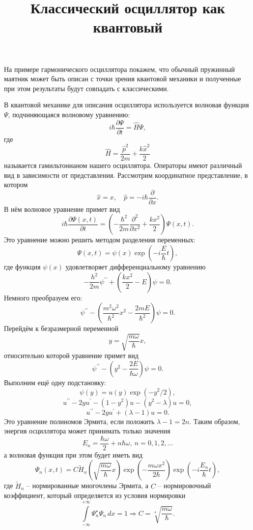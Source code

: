 

\title{Классический осциллятор как квантовый}


\maketitle

На примере гармонического осциллятора покажем, что обычный пружинный маятник может быть описан с точки зрения квантовой механики и полученные при этом результаты будут совпадать с классическими.

В квантовой механике для описания осциллятора используется волновая функция \(\Psi\), подчиняющаяся волновому уравнению:
\[
    i\hbar\frac{\partial \Psi}{\partial t} = \hat{H}\Psi,
\]
где
\[
    \hat{H} = \frac{\hat{p}^2}{2m} + \frac{k\hat{x}^2}{2}
\]
называется гамильтонианом нашего осциллятора. Операторы имеют различный вид в зависимости от представления. Рассмотрим координатное представление, в котором
\[
    \hat{x} = x,\quad \hat{p} = -i\hbar\frac{\partial}{\partial x}.
\]
В нём волновое уравнение примет вид
\[
    i\hbar\frac{\partial \Psi(x,t)}{\partial t} = \left( -\frac{\hbar^2}{2m}\frac{\partial^2}{\partial x^2} + \frac{kx^2}{2} \right)\Psi(x,t).
\]
Это уравнение можно решить методом разделения переменных:
\[
    \Psi(x,t) = \psi(x)\exp\left(-i\frac{E}{\hbar}t\right),
\]
где функция \(\psi(x)\) удовлетворяет дифференциальному уравнению
\[
    -\frac{h^2}{2m}\psi^{\prime\prime} + \left(\frac{kx^2}{2} - E\right)\psi = 0.
\]
Немного преобразуем его:
\[
    \psi^{\prime\prime} - \left(\frac{m^2\omega^2}{\hbar^2}x^2 - \frac{2mE}{\hbar^2}\right)\psi = 0.
\]
Перейдём к безразмерной переменной
\[
    y = \sqrt{\frac{m\omega}{\hbar}}x,
\]
относительно которой уравнение примет вид
\[
    \psi^{\prime\prime} - \left(y^2 - \frac{2E}{\hbar\omega}\right)\psi = 0.
\]
Выполним ещё одну подстановку:
\[
    \psi(y) = u(y)\exp(-y^2/2),
\]
\[
    u^{\prime\prime} - 2y u^\prime - (1 - y^2)u - (y^2 - \lambda)u = 0,
\]
\[
    u^{\prime\prime} - 2y u^\prime + (\lambda - 1)u = 0.
\]
Это уравнение полиномов Эрмита, если положить \( \lambda - 1 = 2n \).
Таким образом, энергия осциллятора может принимать только значения
\[
    E_n = \frac{\hbar\omega}{2} + n\hbar\omega,\ n=0,1,2,\ldots
\]
а волновая функция при этом будет иметь вид
\[
    \Psi_n(x, t) = C\tilde{H}_n\left(\sqrt{\frac{m\omega}{\hbar}}x\right)\exp\left(-\frac{m\omega x^2}{2\hbar}\right)\exp\left(-i\frac{E_n}{\hbar}t\right),
\]
где \( \tilde{H}_n \) -- нормированные многочлены Эрмита, а \( C \) -- нормировочный коэффициент, который определяется из условия нормировки
\[
    \int\limits_{-\infty}^{+\infty} \Psi_n^\star  \Psi_n\,dx = 1 \Rightarrow
    C = \sqrt[4]{\frac{m\omega}{\hbar}}.
\]

